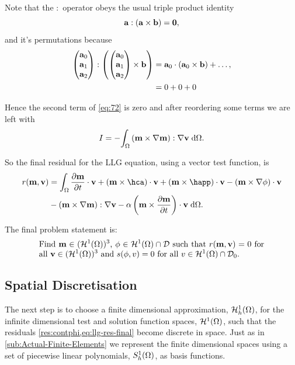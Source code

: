 Note that the $:$ operator obeys the usual triple product identity
\begin{equation}
  {\mathbf{a}} : ({\mathbf{a}} \times {\mathbf{b}}) = \mathbf{0},
  \label{triple:-identity}
\end{equation}
and it's permutations because
\begin{equation}
  \begin{aligned} 
    \begin{pmatrix} {\mathbf{a}}_0 \\ {\mathbf{a}}_1 \\ {\mathbf{a}}_2 \end{pmatrix} : {\left( \begin{pmatrix} {\mathbf{a}}_0 \\ {\mathbf{a}}_1 \\ {\mathbf{a}}_2 \end{pmatrix} \times {\mathbf{b}} \right)} &= {\mathbf{a}}_0 \cdot ({\mathbf{a}}_0 \times {\mathbf{b}}) + \ldots, \\
    & = 0 + 0 + 0
  \end{aligned}
\end{equation}

Hence the second term of \cref{eq:72} is zero and after reordering some terms we are left with
\begin{equation}
  \label{eq:final-lap-residual}
  I = - {\int_{\Omega} {\left( \mathbf{m} \times \nabla \mathbf{m} \right)} : \nabla \mathbf{v} {\; \text{d}} {\Omega}}.
\end{equation}

So the final residual for the LLG equation, using a vector test function, is
\begin{equation}
  \begin{aligned}
    \label{eq:llg-res-final}
    \rllg(\mv, \testv) &= \int_\magd \dmdt\cdot \testv
    + (\mv \times \hca)\cdot \testv 
    + (\mv \times \happ)\cdot \testv 
    - (\mv \times \nabla \phi)\cdot \testv \\
    & - \bigb{\mv \times \grad \mv} : \grad \testv
    - \dampc \left( \mv \times \dmdt \right)\cdot \testv
    \d\magd.
  \end{aligned}
\end{equation}

The final problem statement is: 
\begin{equation}
  \eqpar{Find $\mv \in (\tsinf)^3$, $\phim \in \tsinf \cap \Dfs$ such that $\rllg(\mv, \testv) = 0$ for all $\testv \in (\tsinf)^3$ and $\rphi(\phim, \test) = 0$ for all $\test \in \tsinf \cap \Dfs_0$.}
\label{eq:inf-dim-problem}
\end{equation}




\subsection{Spatial Discretisation}
\label{sec:spat-discr-resi}

The next step is to choose a finite dimensional approximation, ${\mathcal{H}^1_h(\Omega)}$, for the infinite dimensional test and solution function spaces, ${\mathcal{H}^1(\Omega)}$, such that the residuals \cref{res:contphi,eq:llg-res-final} become discrete in space.
Just as in \cref{sub:Actual-Finite-Elements} we represent the finite dimensional spaces using a set of piecewise linear polynomials, ${S_h^1(\Omega)}$, as basis functions.

